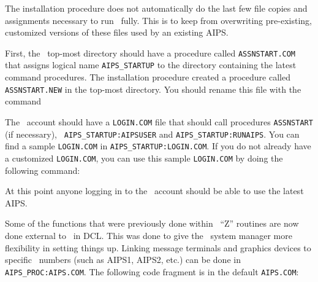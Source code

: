 %
%

\bigskip
{}


The installation procedure does not automatically do the last few file
copies and assignments necessary to run \aips\ fully.  This is to keep
from overwriting pre-existing, customized versions of these files used
by an existing AIPS.

First, the \aips\ top-most directory should have a procedure called
{\tt ASSNSTART.\-COM} that assigns logical name {\tt AIPS\_STARTUP} to
the directory containing the latest command procedures.  The
installation procedure created a procedure called {\tt ASSNSTART.\-NEW}
in the top-most directory.  You should rename this file with the
command\medskip

\medskip

\noindent
The \aips\ account should have a {\tt LOGIN.COM} file that should call
procedures {\tt ASSNSTART} (if necessary), {\tt
AIPS\_STARTUP:AIPSUSER} and {\tt AIPS\_STARTUP:RUNAIPS}.  You can find
a sample {\tt LOGIN.COM} in {\tt AIPS\_STARTUP:LOGIN.COM}.  If you do
not already have a customized {\tt LOGIN.COM}, you can use this sample
{\tt LOGIN.COM} by doing the following command:\medskip

\medskip

\noindent
At this point anyone logging in to the \aips\ account should be able
to use the latest AIPS.

\medskip{}

Some of the functions that were previously done within \aips\ ``Z''
routines are now done external to \aips\ in DCL.  This was done to give
the \aips\ system manager more flexibility in setting things up. Linking
message terminals and graphics devices to specific \aips\ numbers (such
as AIPS1, AIPS2, etc.) can be done in {\tt AIPS\_PROC:AIPS.COM}.  The
following code fragment is in the default {\tt AIPS.COM}:\medskip

